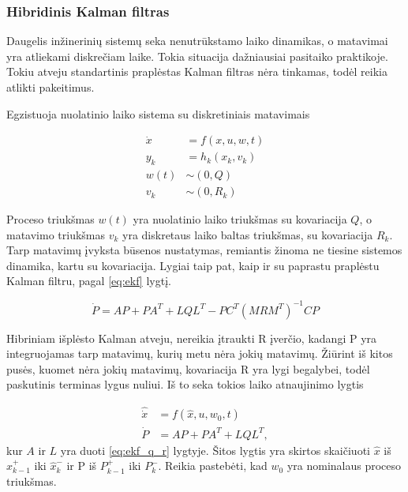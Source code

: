         
	\subsubsection{Hibridinis Kalman filtras}
	
	Daugelis inžinerinių sistemų seka nenutrūkstamo laiko dinamikas, o matavimai yra atliekami diskrečiam laike.
	Tokia situacija dažniausiai pasitaiko praktikoje.
	Tokiu atveju standartinis praplėstas Kalman filtras nėra tinkamas, todėl reikia atlikti pakeitimus.
	
	Egzistuoja nuolatinio laiko sistema su diskretiniais matavimais
	
    \begin{equation}
    	\begin{aligned}
    		\dot{x} &= f(x,u,w,t) \\
    		y_k &= h_k(x_k, v_k) \\
    		w(t) &\sim (0, Q) \\
            v_k &\sim (0, R_k)
    	\end{aligned}
    \end{equation}

    Proceso triukšmas $w(t)$ yra nuolatinio laiko triukšmas su kovariacija $Q$, o matavimo triukšmas $v_k$ yra diskretaus laiko baltas triukšmas, su kovariacija $R_k$.
    Tarp matavimų įvyksta būsenos nustatymas, remiantis žinoma ne tiesine sistemos dinamika, kartu su kovariacija. Lygiai taip pat, kaip ir su paprastu praplėstu Kalman filtru, pagal \ref{eq:ekf} lygtį.

    \begin{equation}
        \dot{P} = AP + PA^T + LQL^T - PC^T(MRM^T)^{-1}CP
    \end{equation}

    Hibriniam išplėsto Kalman atveju, nereikia įtraukti R įverčio, kadangi P yra integruojamas tarp matavimų, kurių metu nėra jokių matavimų.
    Žiūrint iš kitos pusės, kuomet nėra jokių matavimų, kovariacija R yra lygi begalybei, todėl paskutinis terminas lygus nuliui.
    Iš to seka tokios laiko atnaujinimo lygtis

    \begin{equation}
        \begin{aligned}
            \hat{\dot{x}} &= f(\hat{x}, u, w_0, t) \\
            \dot{P} &= AP + PA^T + LQL^T,
        \end{aligned}
    \end{equation}
    kur $A$ ir $L$ yra duoti \ref{eq:ekf_q_r} lygtyje.
    Šitos lygtis yra skirtos skaičiuoti $\hat{x}$ iš $\hat{x}^+_{k-1}$ iki $\hat{x}^-_k$ ir P iš $P^+_{k-1}$ iki $P^-_k$.
    Reikia pastebėti, kad $w_0$ yra nominalaus proceso triukšmas.


